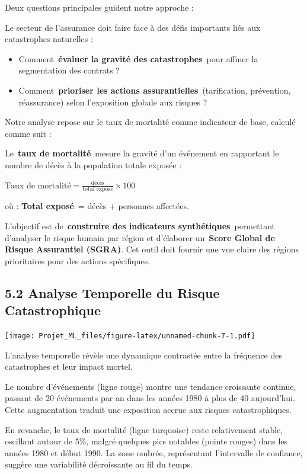 \documentclass[
]{article}
\begin{document}
Deux questions principales guident notre approche :

Le secteur de l'assurance doit faire face à des défis importants liés
aux catastrophes naturelles :

\begin{itemize}
\item
  Comment~\textbf{évaluer la gravité des catastrophes}~pour affiner la
  segmentation des contrats ?
\item
  Comment~\textbf{prioriser les actions assurantielles}~(tarification,
  prévention, réassurance) selon l'exposition globale aux risques ?
\end{itemize}

Notre analyse repose sur le taux de mortalité comme indicateur de base,
calculé comme suit :

Le~\textbf{taux de mortalité}~mesure la gravité d'un événement en
rapportant le nombre de décès à la population totale exposée :

\(\text{Taux de mortalité} = \frac{\text{décès}}{\text{total exposé}} \times 100\)

où : \textbf{Total exposé}~= décès + personnes affectées.

L'objectif est de~\textbf{construire des indicateurs
synthétiques}~permettant d'analyser le risque humain par région et
d'élaborer un~\textbf{Score Global de Risque Assurantiel (SGRA)}. Cet
outil doit fournir une vue claire des régions prioritaires pour des
actions spécifiques.

\subsection{5.2 Analyse Temporelle du Risque
Catastrophique}\label{analyse-temporelle-du-risque-catastrophique}

\texttt{[image: Projet\_ML\_files/figure-latex/unnamed-chunk-7-1.pdf]}

L'analyse temporelle révèle une dynamique contrastée entre la fréquence
des catastrophes et leur impact mortel.

Le nombre d'événements (ligne rouge) montre une tendance croissante
continue, passant de 20 événements par an dans les années 1980 à plus de
40 aujourd'hui. Cette augmentation traduit une exposition accrue aux
risques catastrophiques.

En revanche, le taux de mortalité (ligne turquoise) reste relativement
stable, oscillant autour de 5\%, malgré quelques pics notables (points
rouges) dans les années 1980 et début 1990. La zone ombrée, représentant
l'intervalle de confiance, suggère une variabilité décroissante au fil
du temps.
\end{document}
